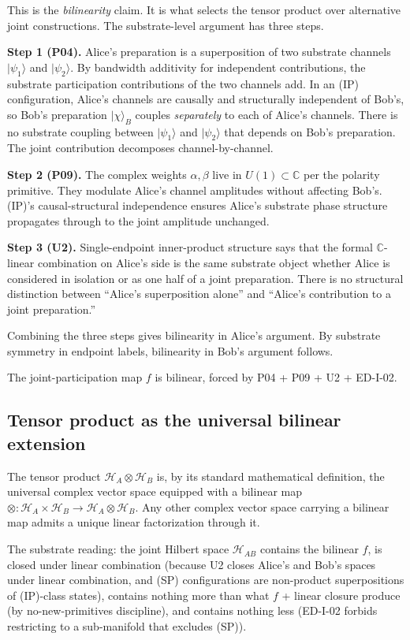 \documentclass[11pt,a4paper]{article}
\begin{document}
This is the \emph{bilinearity} claim. It is what selects the tensor product over alternative joint constructions. The substrate-level argument has three steps.

\textbf{Step 1 (P04).} Alice's preparation is a superposition of two substrate channels $|\psi_1\rangle$ and $|\psi_2\rangle$. By bandwidth additivity for independent contributions, the substrate participation contributions of the two channels add. In an (IP) configuration, Alice's channels are causally and structurally independent of Bob's, so Bob's preparation $|\chi\rangle_B$ couples \emph{separately} to each of Alice's channels. There is no substrate coupling between $|\psi_1\rangle$ and $|\psi_2\rangle$ that depends on Bob's preparation. The joint contribution decomposes channel-by-channel.

\textbf{Step 2 (P09).} The complex weights $\alpha, \beta$ live in $U(1) \subset \mathbb{C}$ per the polarity primitive. They modulate Alice's channel amplitudes without affecting Bob's. (IP)'s causal-structural independence ensures Alice's substrate phase structure propagates through to the joint amplitude unchanged.

\textbf{Step 3 (U2).} Single-endpoint inner-product structure says that the formal $\mathbb{C}$-linear combination on Alice's side is the same substrate object whether Alice is considered in isolation or as one half of a joint preparation. There is no structural distinction between ``Alice's superposition alone'' and ``Alice's contribution to a joint preparation.''

Combining the three steps gives bilinearity in Alice's argument. By substrate symmetry in endpoint labels, bilinearity in Bob's argument follows.

The joint-participation map $f$ is bilinear, forced by P04 + P09 + U2 + ED-I-02.

\subsection{Tensor product as the universal bilinear extension}

The tensor product $\mathcal{H}_A \otimes \mathcal{H}_B$ is, by its standard mathematical definition, the universal complex vector space equipped with a bilinear map $\otimes: \mathcal{H}_A \times \mathcal{H}_B \to \mathcal{H}_A \otimes \mathcal{H}_B$. Any other complex vector space carrying a bilinear map admits a unique linear factorization through it.

The substrate reading: the joint Hilbert space $\mathcal{H}_{AB}$ contains the bilinear $f$, is closed under linear combination (because U2 closes Alice's and Bob's spaces under linear combination, and (SP) configurations are non-product superpositions of (IP)-class states), contains nothing more than what $f$ + linear closure produce (by no-new-primitives discipline), and contains nothing less (ED-I-02 forbids restricting to a sub-manifold that excludes (SP)).
\end{document}
